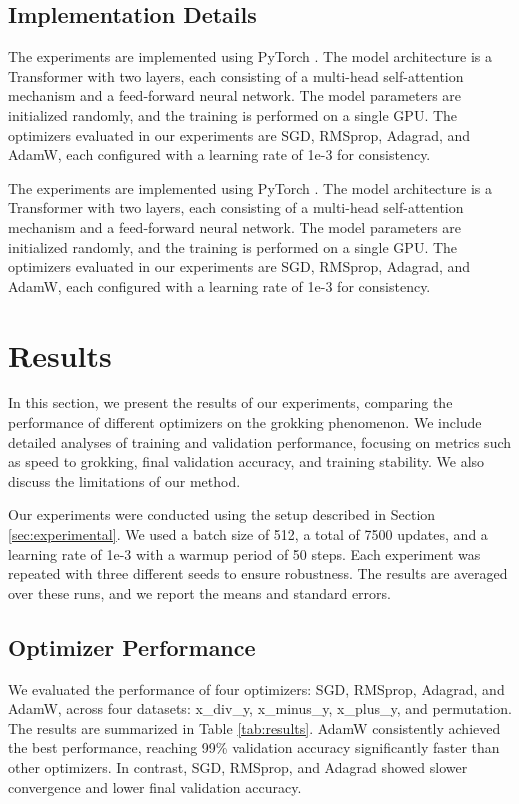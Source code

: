 \documentclass{article} %
\begin{document}
\subsection{Implementation Details}
The experiments are implemented using PyTorch \cite{paszke2019pytorch}. The model architecture is a Transformer \cite{vaswani2017attention} with two layers, each consisting of a multi-head self-attention mechanism and a feed-forward neural network. The model parameters are initialized randomly, and the training is performed on a single GPU. The optimizers evaluated in our experiments are SGD, RMSprop, Adagrad, and AdamW, each configured with a learning rate of 1e-3 for consistency.

The experiments are implemented using PyTorch \cite{paszke2019pytorch}. The model architecture is a Transformer \cite{vaswani2017attention} with two layers, each consisting of a multi-head self-attention mechanism and a feed-forward neural network. The model parameters are initialized randomly, and the training is performed on a single GPU. The optimizers evaluated in our experiments are SGD, RMSprop, Adagrad, and AdamW, each configured with a learning rate of 1e-3 for consistency.

\section{Results}
\label{sec:results}

In this section, we present the results of our experiments, comparing the performance of different optimizers on the grokking phenomenon. We include detailed analyses of training and validation performance, focusing on metrics such as speed to grokking, final validation accuracy, and training stability. We also discuss the limitations of our method.

Our experiments were conducted using the setup described in Section \ref{sec:experimental}. We used a batch size of 512, a total of 7500 updates, and a learning rate of 1e-3 with a warmup period of 50 steps. Each experiment was repeated with three different seeds to ensure robustness. The results are averaged over these runs, and we report the means and standard errors.

\subsection{Optimizer Performance}
We evaluated the performance of four optimizers: SGD, RMSprop, Adagrad, and AdamW, across four datasets: x\_div\_y, x\_minus\_y, x\_plus\_y, and permutation. The results are summarized in Table \ref{tab:results}. AdamW consistently achieved the best performance, reaching 99\% validation accuracy significantly faster than other optimizers. In contrast, SGD, RMSprop, and Adagrad showed slower convergence and lower final validation accuracy.
\end{document}
